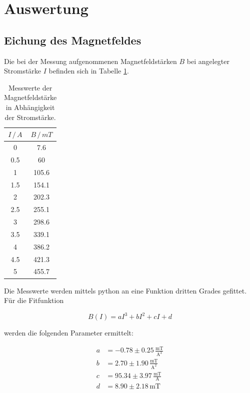 \newpage
\section{Auswertung}
\label{sec:Auswertung}
\subsection{Eichung des Magnetfeldes}
Die bei der Messung aufgenommenen Magnetfeldstärken $B$ bei angelegter Stromstärke $I$ befinden sich in Tabelle \ref{tab:bfeld}.

\begin{table}
    \centering
    \begin{tabular}{c c}
    \toprule
    $I \,/\,A$ & $B \,/\, mT$ \\
     \midrule 
  0  & 7.6  \\
  0.5  & 60  \\
  1  & 105.6   \\
  1.5  & 154.1  \\
  2  & 202.3   \\
  2.5  & 255.1  \\
  3  & 298.6   \\
  3.5  & 339.1  \\
  4  &  386.2   \\
  4.5  &  421.3 \\
  5  & 455.7 \\
    \bottomrule
    \end{tabular}
    \caption{Messwerte der Magnetfeldstärke in Abhängigkeit der Stromstärke.}
    \label{tab:bfeld}
    \end{table}


\noindent
Die Messwerte werden mittels python an eine Funktion dritten Grades gefittet.
Für die Fitfunktion

\begin{equation*}
    B(I)=aI^3 + bI^2 + cI + d
\end{equation*}

\noindent
werden die folgenden Parameter ermittelt:

\begin{align*}
    a&=-0.78 \pm 0.25 \, \frac{\text{mT}}{\text{A}^3} \\
    b&=2.70  \pm 1.90 \, \frac{\text{mT}}{\text{A}^2} \\
    c&=95.34 \pm 3.97 \, \frac{\text{mT}}{\text{A}} \\
    d&=8.90  \pm 2.18 \, \text{mT} \\
\end{align*}

